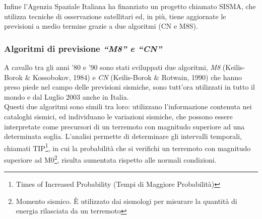 Infine l'Agenzia Spaziale Italiana ha finanziato un progetto chiamato SISMA, che utilizza tecniche di osservazione satellitari ed, in pi\`u, tiene aggiornate le previsioni a medio termine grazie a due algoritmi (CN e M8S). \cite{GiulianoFPanza}

\subsubsection{Algoritmi di previsione \textit{``M8'' e ``CN''}}

A cavallo tra gli anni '80 e '90 sono stati sviluppati due algoritmi, \textit{M8} (Keilis-Borok \& Kossobokov, 1984) e \textit{CN} (Keilis-Borok \& Rotwain, 1990) che hanno preso piede nel campo delle previsioni sismiche, sono tutt'ora utilizzati in tutto il mondo e dal Luglio 2003 anche in Italia.\\
Questi due algoritmi sono simili tra loro: utilizzano l'informazione contenuta nei cataloghi sismici, ed individuano le variazioni sismiche, che possono essere interpretate come precursori di un terremoto con magnitudo superiore ad una determinata soglia. L'analisi permette di determinare gli intervalli temporali, chiamati TIP\footnote{Times of Increased Probability (Tempi di Maggiore Probabilit\`a)}, in cui la probabilit\`a che si verifichi un terremoto con magnitudo superiore ad M0\footnote{Momento sismico. \`E utilizzato dai sismologi per misurare la quantit\`a di energia rilasciata da un terremoto}, risulta aumentata rispetto alle normali condizioni.\\
